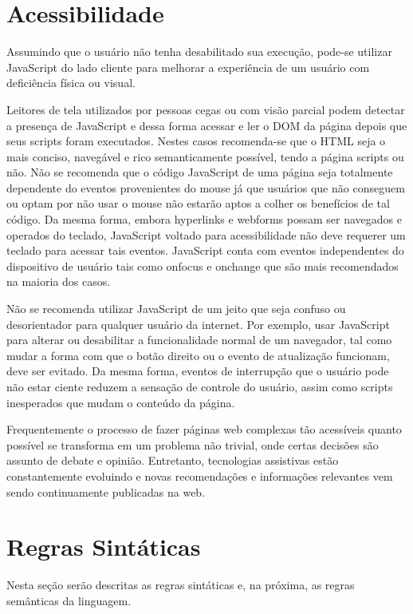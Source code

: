 \documentclass[
	article,			%
	11pt,				%
	oneside,			%
	a4paper,			%
	english,			%
	brazil,				%
	]{abntex2}
\begin{document}
    \section{Acessibilidade}
        Assumindo que o usuário não tenha desabilitado sua execução, pode-se utilizar JavaScript do lado cliente para melhorar a experiência de um usuário com deficiência física ou visual.
    
        Leitores de tela utilizados por pessoas cegas ou com visão parcial podem detectar a presença de JavaScript e dessa forma acessar e ler o DOM da página depois que seus scripts foram executados. Nestes casos recomenda-se que o HTML seja o mais conciso, navegável e rico semanticamente possível, tendo a página scripts ou não. Não se recomenda que o código JavaScript de uma página seja totalmente dependente do eventos provenientes do mouse já que usuários que não conseguem ou optam por não usar o mouse não estarão aptos a colher os benefícios de tal código. Da mesma forma, embora hyperlinks e webforms possam ser navegados e operados do teclado, JavaScript voltado para acessibilidade não deve requerer um teclado para acessar tais eventos. JavaScript conta com eventos independentes do dispositivo de usuário tais como onfocus e onchange que são mais recomendados na maioria dos casos.
    
        Não se recomenda utilizar JavaScript de um jeito que seja confuso ou desorientador para qualquer usuário da internet. Por exemplo, usar JavaScript para alterar ou desabilitar a funcionalidade normal de um navegador, tal como mudar a forma com que o botão direito ou o evento de atualização funcionam, deve ser evitado. Da mesma forma, eventos de interrupção que o usuário pode não estar ciente reduzem a sensação de controle do usuário, assim como scripts inesperados que mudam o conteúdo da página.
    
        Frequentemente o processo de fazer páginas web complexas tão acessíveis quanto possível se transforma em um problema não trivial, onde certas decisões são assunto de debate e opinião. Entretanto, tecnologias assistivas estão constantemente evoluindo e novas recomendações e informações relevantes vem sendo continuamente publicadas na web.

    \section{Regras Sintáticas}
        Nesta seção serão descritas as regras sintáticas e, na próxima, as regras semânticas da linguagem\cite{crockford2008javascript}.
    
\end{document}
